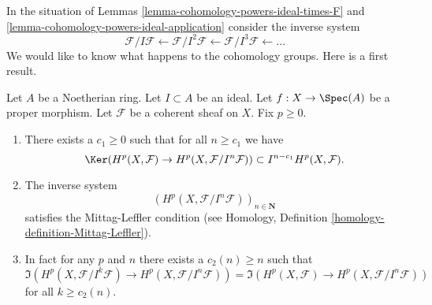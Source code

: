 \noindent
In the situation of Lemmas \ref{lemma-cohomology-powers-ideal-times-F} and
\ref{lemma-cohomology-powers-ideal-application} consider the inverse
system
$$
\mathcal{F}/I\mathcal{F} \leftarrow
\mathcal{F}/I^2\mathcal{F} \leftarrow
\mathcal{F}/I^3\mathcal{F} \leftarrow \ldots
$$
We would like to know what happens to the cohomology groups.
Here is a first result.

\begin{lemma}
\label{lemma-ML-cohomology-powers-ideal}
Let $A$ be a Noetherian ring.
Let $I \subset A$ be an ideal.
Let $f : X \to \Spec(A)$ be a proper morphism.
Let $\mathcal{F}$ be a coherent sheaf on $X$.
Fix $p \geq 0$.
\begin{enumerate}
\item There exists a $c_1 \geq 0$ such that for all $n \geq c_1$
we have
$$
\Ker(
H^p(X, \mathcal{F}) \to H^p(X, \mathcal{F}/I^n\mathcal{F})
)
\subset
I^{n - c_1}H^p(X, \mathcal{F}).
$$
\item The inverse system
$$
\left(H^p(X, \mathcal{F}/I^n\mathcal{F})\right)_{n \in \mathbf{N}}
$$
satisfies the Mittag-Leffler condition (see
Homology, Definition \ref{homology-definition-Mittag-Leffler}).
\item In fact for any $p$ and $n$ there exists a $c_2(n) \geq n$
such that
$$
\Im(H^p(X, \mathcal{F}/I^k\mathcal{F})
\to H^p(X, \mathcal{F}/I^n\mathcal{F}))
=
\Im(H^p(X, \mathcal{F})
\to H^p(X, \mathcal{F}/I^n\mathcal{F}))
$$
for all $k \geq c_2(n)$.
\end{enumerate}
\end{lemma}

